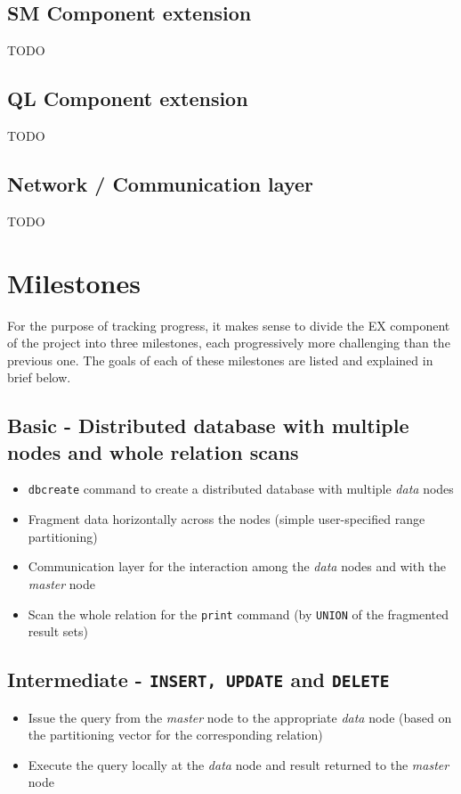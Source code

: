 \documentclass[letterpaper,11pt]{article}
\begin{document}
\subsection{SM Component extension}
TODO

\subsection{QL Component extension}
TODO

\subsection{Network / Communication layer}
TODO

\section{Milestones}
For the purpose of tracking progress, it makes sense to divide the EX component of the project into
three milestones, each progressively more challenging than the previous one. The goals of each of
these milestones are listed and explained in brief below.

\subsection{Basic - Distributed database with multiple nodes and whole relation scans}
\begin{itemize}
\item \texttt{dbcreate} command to create a distributed database with multiple \textit{data} nodes
\item Fragment data horizontally across the nodes (simple user-specified range partitioning)
\item Communication layer for the interaction among the \textit{data} nodes and with the
\textit{master} node
\item Scan the whole relation for the \texttt{print} command (by \texttt{UNION} of the fragmented
result sets)
\end{itemize}

\subsection{Intermediate - \texttt{INSERT, UPDATE} and \texttt{DELETE}}
\begin{itemize}
\item Issue the query from the \textit{master} node to the appropriate \textit{data} node (based on
the partitioning vector for the corresponding relation)
\item Execute the query locally at the \textit{data} node and result returned to the \textit{master}
node
\end{itemize}
\end{document}

